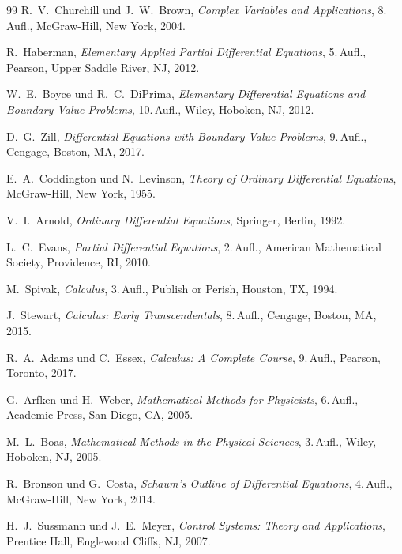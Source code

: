 \documentclass[a4paper, 12pt, twoside, openright]{report}
\theoremstyle{definition}
\theoremstyle{definition}
\begin{document}
\begin{thebibliography}{99}
	R.~V.~Churchill und J.~W.~Brown,
	\textit{Complex Variables and Applications},
	8.\,Aufl., McGraw-Hill, New York, 2004.

	R.~Haberman,
	\textit{Elementary Applied Partial Differential Equations},
	5.\,Aufl., Pearson, Upper Saddle River, NJ, 2012.

	W.~E.~Boyce und R.~C.~DiPrima,
	\textit{Elementary Differential Equations and Boundary Value Problems},
	10.\,Aufl., Wiley, Hoboken, NJ, 2012.

	D.~G.~Zill,
	\textit{Differential Equations with Boundary-Value Problems},
	9.\,Aufl., Cengage, Boston, MA, 2017.

	E.~A.~Coddington und N.~Levinson,
	\textit{Theory of Ordinary Differential Equations},
	McGraw-Hill, New York, 1955.

	V.~I.~Arnold,
	\textit{Ordinary Differential Equations},
	Springer, Berlin, 1992.

	L.~C.~Evans,
	\textit{Partial Differential Equations},
	2.\,Aufl., American Mathematical Society, Providence, RI, 2010.

	M.~Spivak,
	\textit{Calculus},
	3.\,Aufl., Publish or Perish, Houston, TX, 1994.

	J.~Stewart,
	\textit{Calculus: Early Transcendentals},
	8.\,Aufl., Cengage, Boston, MA, 2015.

	R.~A.~Adams und C.~Essex,
	\textit{Calculus: A Complete Course},
	9.\,Aufl., Pearson, Toronto, 2017.

	G.~Arfken und H.~Weber,
	\textit{Mathematical Methods for Physicists},
	6.\,Aufl., Academic Press, San Diego, CA, 2005.

	M.~L.~Boas,
	\textit{Mathematical Methods in the Physical Sciences},
	3.\,Aufl., Wiley, Hoboken, NJ, 2005.

	R.~Bronson und G.~Costa,
	\textit{Schaum's Outline of Differential Equations},
	4.\,Aufl., McGraw-Hill, New York, 2014.

	H.~J.~Sussmann und J.~E.~Meyer,
	\textit{Control Systems: Theory and Applications},
	Prentice Hall, Englewood Cliffs, NJ, 2007.


\end{thebibliography}
\end{document}
